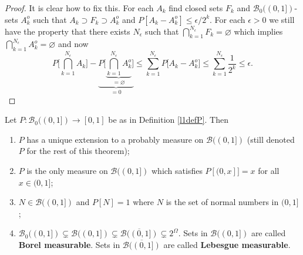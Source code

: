 \begin{proof}
It is clear how to fix this. For each $A_k$ find  closed sets $F_k$ and $\mathcal B_0((0,1])$-sets $A_k^o$ such that $A_k\supset F_k \supset A_k^o$ and $P[A_k-A_k^o]\leq \epsilon / 2^k$. For each $\epsilon>0$ we still have the property that there exists $N_\epsilon$ such that  $\bigcap_{k=1}^{N_\epsilon}F_k = \varnothing$ which  implies $\bigcap_{k=1}^{N_\epsilon}A^o_k = \varnothing$  and now
\[
P\bigl[ \textstyle\bigcap_{k=1}^{N_\epsilon} A_k\bigr] - \underbrace{P\bigl[ \underbrace{\textstyle\bigcap_{k=1}^{N_\epsilon} A^o_k}_{=\varnothing}\bigr]}_{=0}\leq  \sum_{k=1}^{N_\epsilon} P\bigl[A_k-A^o_k \bigr] \leq \sum_{k=1}^{N_\epsilon} \frac{1}{2^k}\leq \epsilon.
\]
\end{proof}



\begin{theorem}
Let $P:\mathcal B_0((0,1])\rightarrow [0,1]$ be as in Definition \ref{l1defP}. Then
\begin{enumerate}
\item\label{BB item 1} $P$ has a unique extension to a probably measure  on $\mathcal B((0,1])$ (still denoted $P$ for the rest of this theorem);
\item\label{BB item 2} $P$ is the only measure on  $\mathcal B((0,1])$ which satisfies $P[(0,x]]=x$ for all $x\in (0,1]$;
\item\label{BB item 3} $N\in \mathcal B((0,1])$ and $P[N]=1$ where $N$ is the set of normal numbers in $(0,1]$;
\item\label{BB item 4} $\mathcal B_0((0,1]) \subsetneq \mathcal B((0,1]) \subsetneq  \overline{\mathcal B((0,1])}\subsetneq 2^\Omega$. Sets in $\mathcal B((0,1])$ are called {\bf Borel measurable}. Sets in $\overline{\mathcal B((0,1])}$ are called {\bf Lebesgue measurable}.
\end{enumerate}
\end{theorem}

